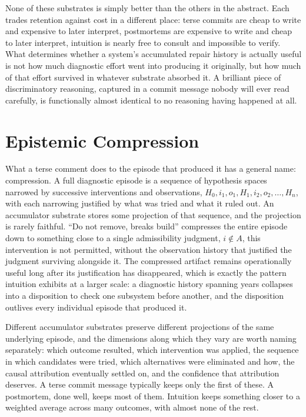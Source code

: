\documentclass[11pt]{article}
\begin{document}
None of these substrates is simply better than the others in the abstract. Each trades retention against cost in a different place: terse commits are cheap to write and expensive to later interpret, postmortems are expensive to write and cheap to later interpret, intuition is nearly free to consult and impossible to verify. What determines whether a system's accumulated repair history is actually useful is not how much diagnostic effort went into producing it originally, but how much of that effort survived in whatever substrate absorbed it. A brilliant piece of discriminatory reasoning, captured in a commit message nobody will ever read carefully, is functionally almost identical to no reasoning having happened at all.

\section{Epistemic Compression}

What a terse comment does to the episode that produced it has a general name: compression. A full diagnostic episode is a sequence of hypothesis spaces narrowed by successive interventions and observations, $H_0, i_1, o_1, H_1, i_2, o_2, \ldots, H_n$, with each narrowing justified by what was tried and what it ruled out. An accumulator substrate stores some projection of that sequence, and the projection is rarely faithful. ``Do not remove, breaks build'' compresses the entire episode down to something close to a single admissibility judgment, $i \notin A$, this intervention is not permitted, without the observation history that justified the judgment surviving alongside it. The compressed artifact remains operationally useful long after its justification has disappeared, which is exactly the pattern intuition exhibits at a larger scale: a diagnostic history spanning years collapses into a disposition to check one subsystem before another, and the disposition outlives every individual episode that produced it.

Different accumulator substrates preserve different projections of the same underlying episode, and the dimensions along which they vary are worth naming separately: which outcome resulted, which intervention was applied, the sequence in which candidates were tried, which alternatives were eliminated and how, the causal attribution eventually settled on, and the confidence that attribution deserves. A terse commit message typically keeps only the first of these. A postmortem, done well, keeps most of them. Intuition keeps something closer to a weighted average across many outcomes, with almost none of the rest.
\end{document}
